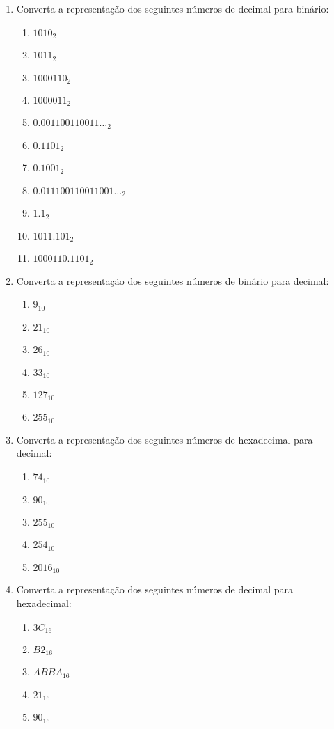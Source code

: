 \documentclass[a4paper]{article}
\begin{document}
\begin{enumerate}
\item Converta a representação dos seguintes números de decimal para binário:

  \begin{enumerate}
  \item $1010_{2}$
  \item $1011_{2}$
  \item $1000110_{2}$
  \item $1000011_{2}$
  \item $0.001100110011\ldots_{2}$
  \item $0.1101_{2}$
  \item $0.1001_{2}$
  \item $0.011100110011001\ldots_{2}$
  \item $1.1_{2}$
  \item $1011.101_{2}$
  \item $1000110.1101_{2}$
  \end{enumerate}

\item Converta a representação dos seguintes números de binário para
  decimal:
  \begin{enumerate}
  \item $9_{10}$
  \item $21_{10}$
  \item $26_{10}$
  \item $33_{10}$
  \item $127_{10}$
  \item $255_{10}$
  \end{enumerate}

\item Converta a representação dos seguintes números de hexadecimal
  para decimal:
  \begin{enumerate}
  \item $74_{10}$
  \item $90_{10}$
  \item $255_{10}$
  \item $254_{10}$
  \item $2016_{10}$
  \end{enumerate}

\item Converta a representação dos seguintes números de decimal para
  hexadecimal:
  \begin{enumerate}
  \item $3C_{16}$
  \item $B2_{16}$
  \item $ABBA_{16}$
  \item $21_{16}$
  \item $90_{16}$
  \end{enumerate}
\end{enumerate}
\end{document}
